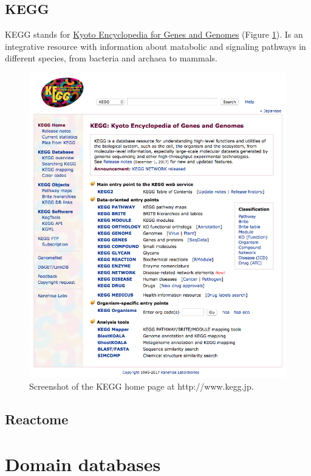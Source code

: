 \documentclass[]{book}
\theoremstyle{definition}
\theoremstyle{definition}
\theoremstyle{definition}
\theoremstyle{remark}
\begin{document}
\subsection{KEGG}\label{kegg}

KEGG stands for \href{http://www.kegg.jp}{Kyoto Encyclopedia for Genes
and Genomes} (Figure \ref{fig:kegg-web}). Is an integrative resource
with information about matabolic and signaling pathways in different
species, from bacteria and archaea to mammals.

\begin{figure}
\includegraphics[width=10.4in]{pic/kegg_web} \caption{Screenshot of the KEGG home page at http://www.kegg.jp.}\label{fig:kegg-web}
\end{figure}

\subsection{Reactome}\label{reactome}

\section{Domain databases}\label{domain-databases}
\end{document}
